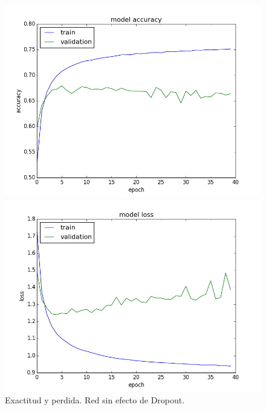 \documentclass{article}[12pt, a4paper]
\begin{document}
\begin{figure}[b]
	\begin{minipage}[h]{0.49\textwidth}
		\includegraphics[width=\textwidth]{ej3facc}
	\end{minipage}
	\begin{minipage}[h]{0.49\textwidth}
		\includegraphics[width=\textwidth]{ej3floss}
	\end{minipage}
	\caption{Exactitud y perdida. Red sin efecto de Dropout.}
	\label{ej3f}
\end{figure}
\end{document}
